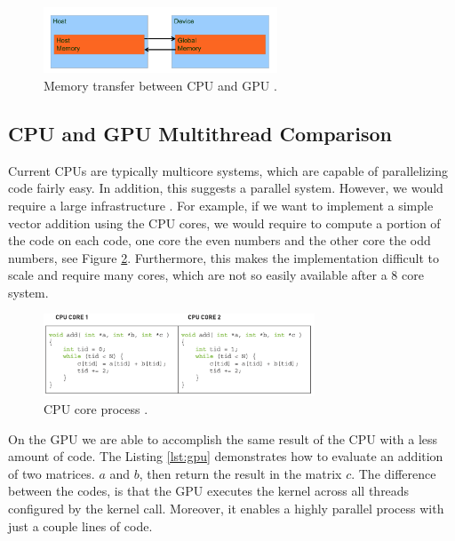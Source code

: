 \begin{figure}[htbp]
	\centering
		\includegraphics[width=0.62\textwidth]{Figures/memorySpace.png}
		\smallskip
	\caption[Memory transfer between CPU and GPU]{Memory transfer between CPU and GPU \cite{hwu}.}
	\label{fig:memorySpace}
\end{figure}

\subsection{CPU and GPU Multithread Comparison}

Current CPUs are typically multicore systems, which are capable of parallelizing code fairly easy. In addition, this suggests a parallel system. However, we would require a large infrastructure \cite{example}. For example, if we want to implement a simple vector addition using the CPU cores, we would require to compute a portion of the code on each code, one core the even numbers and the other core the odd numbers, see Figure \ref{fig:cpu}. Furthermore, this makes the implementation difficult to scale and require many cores, which are not so easily available after a 8 core system. 

\begin{figure}[htbp]
	\centering
		\includegraphics[width=0.72\textwidth]{Figures/cpu.png}
		\smallskip
	\caption[CPU core process]{CPU core process \cite{hwu}.}
	\label{fig:cpu}
\end{figure}


On the GPU we are able to accomplish the same result of the CPU with a less amount of code. The Listing \ref{lst:gpu} demonstrates how to evaluate an addition of two matrices. $a$ and $b$, then return the result in the matrix $c$. The difference between the codes, is that the GPU executes the kernel across all threads configured by the kernel call. Moreover, it enables a highly parallel process with just a couple lines of code. 

